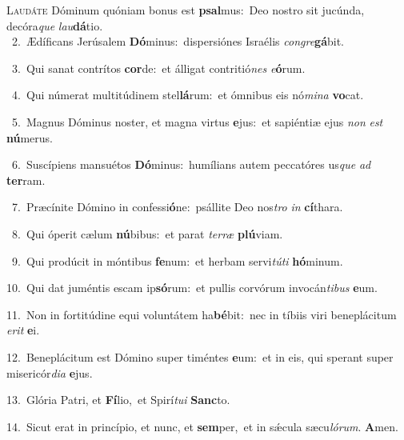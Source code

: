 \lettrine{\initial\textcolor{\initialcolor}{L}}{audáte} Dóminum quóniam bonus est \textbf{psal}\-mus:~\star Deo nostro sit jucúnda, decóra\textit{que} \textit{lau}\-\textbf{dá}tio.\\
{\numbfont\textcolor{\numbcolor}{~2.}}~Ædíficans Jerúsalem \textbf{Dó}\-minus:~\star dispersiónes Israélis \textit{con}\-\textit{gre}\textbf{gá}bit.\par
{\numbfont\textcolor{\numbcolor}{~3.}}~Qui sanat contrítos \textbf{cor}\-de:~\star et álligat contritió\textit{nes} \textit{e}\-\textbf{ó}rum.\par
{\numbfont\textcolor{\numbcolor}{~4.}}~Qui númerat multitúdinem stel\-\textbf{lá}\-rum:~\star et ómnibus eis nó\-\textit{mi}\-\textit{na} \textbf{vo}\-cat.\par
{\numbfont\textcolor{\numbcolor}{~5.}}~Magnus Dóminus noster, et magna virtus \textbf{e}\-jus:~\star et sapiéntiæ ejus \textit{non} \textit{est} \textbf{nú}\-merus.\par
{\numbfont\textcolor{\numbcolor}{~6.}}~Suscípiens mansuétos \textbf{Dó}\-minus:~\star humílians autem peccatóres us\textit{que} \textit{ad} \textbf{ter}\-ram.\par
{\numbfont\textcolor{\numbcolor}{~7.}}~Præcínite Dómino in confessi\-\textbf{ó}\-ne:~\star psállite Deo nos\textit{tro} \textit{in} \textbf{cí}\-thara.\par
{\numbfont\textcolor{\numbcolor}{~8.}}~Qui óperit cælum \textbf{nú}\-bibus:~\star et parat \textit{ter}\-\textit{ræ} \textbf{plú}\-viam.\par
{\numbfont\textcolor{\numbcolor}{~9.}}~Qui prodúcit in móntibus \textbf{fe}\-num:~\star et herbam servi\-\textit{tú}\-\textit{ti} \textbf{hó}\-minum.\par
{\numbfont\textcolor{\numbcolor}{10.}}~Qui dat juméntis escam ip\-\textbf{só}\-rum:~\star et pullis corvórum invocán\-\textit{ti}\-\textit{bus} \textbf{e}\-um.\par
{\numbfont\textcolor{\numbcolor}{11.}}~Non in fortitúdine equi voluntátem ha\-\textbf{bé}\-bit:~\star nec in tíbiis viri beneplácitum \textit{e}\-\textit{rit} \textbf{e}\-i.\par
{\numbfont\textcolor{\numbcolor}{12.}}~Beneplácitum est Dómino super timéntes \textbf{e}\-um:~\star et in eis, qui sperant super misericór\-\textit{di}\-\textit{a} \textbf{e}\-jus.\par
{\numbfont\textcolor{\numbcolor}{13.}}~Glória Patri, et \textbf{Fí}\-lio,~\star et Spirí\-\textit{tu}\-\textit{i} \textbf{Sanc}\-to.\par
{\numbfont\textcolor{\numbcolor}{14.}}~Sicut erat in princípio, et nunc, et \textbf{sem}\-per,~\star et in sǽcula sæcu\-\textit{ló}\-\textit{rum}. \textbf{A}\-men.\par
